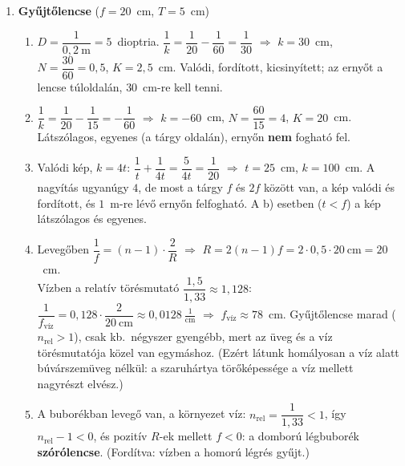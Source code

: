 \documentclass[11pt,a4paper]{article}
\begin{document}
\begin{enumerate}
\item \textbf{Gyűjtőlencse} ($f = 20$~cm, $T = 5$~cm)
  \begin{enumerate}
    \item $D = \dfrac{1}{0{,}2~\text{m}} = 5$~dioptria.
      $\dfrac1k = \dfrac1{20} - \dfrac1{60} = \dfrac1{30}$ $\Rightarrow$ $k = 30$~cm,
      $N = \dfrac{30}{60} = 0{,}5$, $K = 2{,}5$~cm. Valódi, fordított, kicsinyített; az ernyőt
      a lencse túloldalán, $30$~cm-re kell tenni.
    \item $\dfrac1k = \dfrac1{20} - \dfrac1{15} = -\dfrac1{60}$ $\Rightarrow$ $k = -60$~cm,
      $N = \dfrac{60}{15} = 4$, $K = 20$~cm. Látszólagos, egyenes (a tárgy oldalán), ernyőn
      \textbf{nem} fogható fel.
    \item Valódi kép, $k = 4t$: $\dfrac1t + \dfrac1{4t} = \dfrac{5}{4t} = \dfrac1{20}$
      $\Rightarrow$ $t = 25$~cm, $k = 100$~cm. A nagyítás ugyanúgy $4$, de most a tárgy
      $f$ és $2f$ között van, a kép valódi és fordított, és $1$~m-re lévő ernyőn felfogható.
      A b) esetben ($t < f$) a kép látszólagos és egyenes.
    \item Levegőben $\dfrac1f = (n-1)\cdot\dfrac2R$ $\Rightarrow$
      $R = 2(n-1)f = 2\cdot 0{,}5\cdot 20~\text{cm} = 20$~cm.\\
      Vízben a relatív törésmutató $\dfrac{1{,}5}{1{,}33} \approx 1{,}128$:
      $\dfrac1{f_\text{víz}} = 0{,}128\cdot\dfrac{2}{20~\text{cm}} \approx
      0{,}0128~\tfrac1{\text{cm}}$ $\Rightarrow$ $f_\text{víz} \approx 78$~cm.
      Gyűjtőlencse marad ($n_\text{rel} > 1$), csak kb.\ négyszer gyengébb, mert az üveg és a
      víz törésmutatója közel van egymáshoz. (Ezért látunk homályosan a víz alatt búvárszemüveg
      nélkül: a szaruhártya törőképessége a víz mellett nagyrészt elvész.)
    \item A buborékban levegő van, a környezet víz: $n_\text{rel} = \dfrac{1}{1{,}33} < 1$, így
      $n_\text{rel} - 1 < 0$, és pozitív $R$-ek mellett $f < 0$: a domború légbuborék
      \textbf{szórólencse}. (Fordítva: vízben a homorú légrés gyűjt.)
  \end{enumerate}


\end{enumerate}
\end{document}
